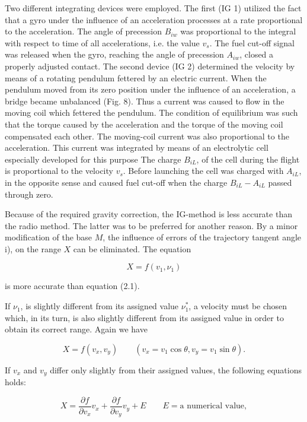 \documentclass[12pt, a4paper]{article}
\begin{document}
\begin{enumerate}
Two different integrating devices were employed. The first (IG 1) utilized the fact that a gyro under the influence of an acceleration processes at a rate proportional to the acceleration. The angle of precession $B_{iw}$ was proportional to the integral with respect to time of all accelerations, i.e. the value $v_{s}$. The fuel cut-off signal was released when the gyro, reaching the angle of precession $A_{iw}$, closed a properly adjusted contact. The second device (IG 2) determined the velocity by means of a rotating pendulum fettered by an electric current. When the pendulum moved from its zero position under the influence of an acceleration, a bridge became unbalanced (Fig. 8). Thus a current was caused to flow in the moving coil which fettered the pendulum. The condition of equilibrium was such that the torque caused by the acceleration and the torque of the moving coil compensated each other. The moving-coil current was also proportional to the acceleration. This current was integrated by means of an electrolytic cell especially developed for this purpose The charge $B_{iL}$, of the cell during the flight is proportional to the velocity $v_{s}$. Before launching the cell was charged with $A_{iL}$, in the opposite sense and caused fuel cut-off when the charge $B_{iL}-A_{iL}$ passed through zero.

Because of the required gravity correction, the IG-method is less accurate than the radio method. The latter was to be preferred for another reason. By a minor modification of the base $M$, the influence of errors of the trajectory tangent angle i), on the range $X$ can be eliminated. The equation

\begin{equation}
  X=f(v_{1}, \nu_{1})
\end{equation}

is more accurate than equation (2.1).

If $\nu_{1}$, is slightly different from its assigned value  $\nu_{1}^{*}$, a velocity must be chosen which, in its turn, is also slightly different from its assigned value in order to obtain its correct range. Again we have

\begin{equation}
  X=f(v_{x}, v_{y})\quad\quad(v_{x}=v_{1}\cos\theta, v_{y}=v_{1}\sin\theta).
\end{equation}

If $v_{x}$ and $v_{y}$ differ only slightly from their assigned values, the following
equations holds:

\begin{equation}
  X=\frac{\partial f}{\partial v_{x}}v_{x}+\frac{\partial f}{\partial v_{y}}v_{y}+E\quad\quad{E=\text{a numerical value}},
\end{equation}


\end{enumerate}
\end{document}
